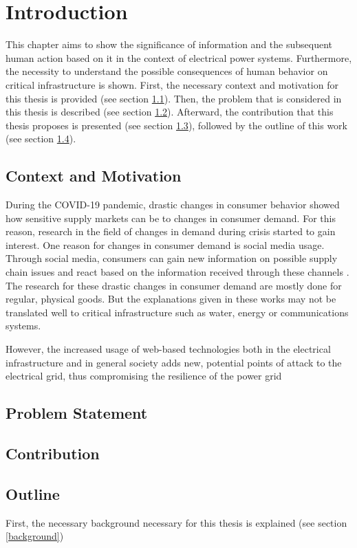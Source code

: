 \chapter{Introduction}

This chapter aims to
show the significance of information and the subsequent human action based on it
in the context of electrical power systems.
Furthermore, the necessity to understand the possible consequences 
of human behavior on critical infrastructure is shown. 
First, the necessary context and motivation for this thesis is provided
(see section \ref{contextmotivation}).
Then, the problem that is considered in this thesis is described 
(see section \ref{problemstatement}). Afterward, the contribution that this
thesis proposes is presented (see section \ref{contribution}), 
followed by the outline of this work (see section \ref{outline}).

\section{Context and Motivation}
\label{contextmotivation}

During the COVID-19 pandemic, drastic changes in consumer behavior
showed how sensitive supply markets can be to changes in consumer demand.
For this reason, research in the field of changes in demand during crisis
started to gain interest. One reason for changes in consumer demand is 
social media usage. Through social media, consumers can gain new information
on possible supply chain issues and react based on the information received 
through these channels \cite{naeem2021social}.
The research for these drastic changes in consumer demand are mostly
done for regular, physical goods. But the explanations given in these 
works may not be translated well to critical infrastructure such as 
water, energy or communications systems.


However, the increased usage of web-based technologies both in the 
electrical infrastructure and in general society adds new, potential points
of attack to the electrical grid, thus compromising the resilience of the 
power grid

\section{Problem Statement}
\label{problemstatement}
\section{Contribution}
\label{contribution}
\section{Outline}
\label{outline}

First, the necessary background necessary for this thesis is explained
(see section \ref{background})